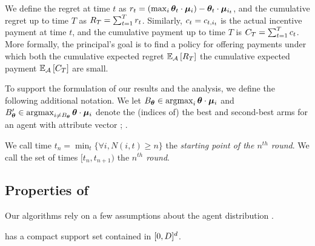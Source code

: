 We define the regret at time $t$ as
$r_{t} = (\max_{i} \bm{\theta}_{t} \cdot \bm{\mu}_{i}) - \bm{\theta}_{t} \cdot \bm{\mu}_{i_{t}}$,
and the cumulative regret up to time $T$ as
$R_{T} = \sum_{t=1}^{T} r_{t}$.
Similarly, $c_{t} = c_{t,i_{t}}$ is the actual incentive
payment at time $t$,
and the cumulative payment up to time $T$ is
$C_{T} = \sum_{t=1}^{T} c_{t}$.
More formally, the principal's goal is to find a policy
\POLICY for offering payments under which both the cumulative expected
regret
$\Expect[\POLICY]{\TotalRegret{T}}$ the cumulative expected payment
$\Expect[\POLICY]{\TotalPay{T}}$ are small.

To support the formulation of our results and the analysis,
we define the following additional notation.
We let
$B_{\bm{\theta}} \in \mathop{\mathrm{argmax}}_i \bm{\theta} \cdot \bm{\mu}_{i}$
and
$ B'_{\bm{\theta}} \in \mathop{\mathrm{argmax}}_{i \neq B_{\bm{\theta}}} \bm{\theta} \cdot \bm{\mu}_{i}$
denote the (indices of) the best and second-best arms for an agent
with attribute vector \AgV;
.

We call time $t_{n}=\min_{t}\{\forall i, N(i,t)\geq n\}$ the
\emph{starting point of the $n^{th}$ round}.
We call the set of times $[t_{n}, t_{n+1})$ the
\emph{$n^{th}$ round}.




\subsection{Properties of \AgentDist}
Our algorithms rely on a few assumptions about the agent distribution
\AgentDist.

\begin{assumption} \label{A2}
\AgentDist has a compact support set contained in $[0,D]^d$.
\end{assumption}

